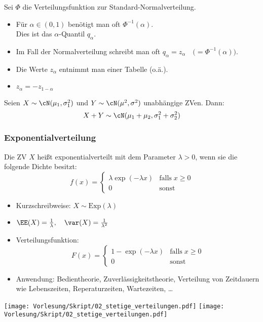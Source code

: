 \documentclass{scrreprt}
\begin{document}
 Sei $\Phi$ die Verteilungsfunktion zur Standard-Normalverteilung.
\begin{itemize}
\item Für $\alpha \in (0,1)$ benötigt man oft $\Phi^{-1}(\alpha)$.\\
Dies ist das $\alpha$-Quantil $q_\alpha$.
\item Im Fall der Normalverteilung schreibt man oft $q_\alpha = z_\alpha \quad\Big(=\Phi^{-1}(\alpha)\Big)$.
\item Die Werte $z_\alpha$ entnimmt man einer Tabelle (o.ä.).
\item $z_\alpha = - z_{1-\alpha}$
\end{itemize}

 Seien $X\sim \cN(\mu_1, \sigma_1^2)$ und $Y\sim \cN(\mu^2, \sigma^2)$ unabhängige ZVen. Dann:
$$X+Y \sim \cN (\mu_1+\mu_2, \sigma_1^2+\sigma_2^2)$$

\subsubsection{Exponentialverteilung}
 Die ZV $X$ heißt exponentialverteilt mit dem Parameter $\lambda >0$, wenn sie die folgende Dichte besitzt:
$$f(x)=\begin{cases}
\lambda \exp(-\lambda x) & \mathrm{falls} \; x\geq 0\\
0 & \mathrm{sonst}
\end{cases}
$$
\begin{itemize}
\item Kurzschreibweise: $X\sim \mathrm{Exp}(\lambda)$
\item $\EE(X)=\frac{1}{\lambda}, \quad \var(X)=\frac{1}{\lambda^2}$
\item Verteilungsfunktion:
$$F(x)=\begin{cases}
1-\exp(-\lambda x) & \mathrm{falls}\; x \geq 0\\
0 & \mathrm{sonst}
\end{cases}$$
\item Anwendung: Bedientheorie, Zuverlässigkeitstheorie, Verteilung von Zeitdauern wie Lebenszeiten, Reperaturzeiten, Wartezeiten, …
\end{itemize}

\begin{center}
\texttt{[image: Vorlesung/Skript/02\_stetige\_verteilungen.pdf]}
\texttt{[image: Vorlesung/Skript/02\_stetige\_verteilungen.pdf]}
\end{center}
\end{document}
